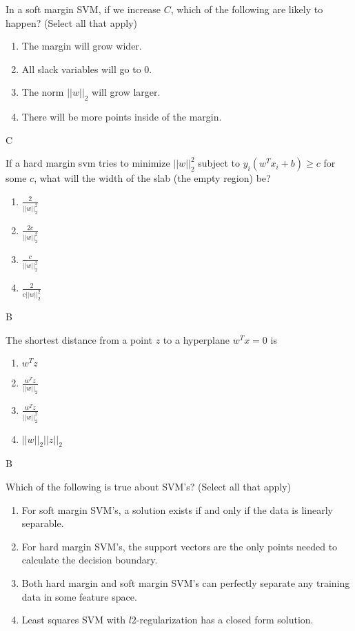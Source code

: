 
\begin{Parts}
\Part In a soft margin SVM, if we increase $C$, which of the following are likely to happen? (Select all that apply)


\begin{enumerate}
\item The margin will grow wider.
\item All slack variables will go to 0.
\item The norm $||w||_2$ will grow larger.
\item There will be more points inside of the margin.
\end{enumerate}

\begin{solution}
C
\end{solution}

\Part If a hard margin svm tries to minimize $||w||_2^2$ subject to $y_i(w^T x_i + b) \geq c$ for some $c$, what will the width of the slab (the empty region) be? 

\begin{enumerate}
\item $\frac{2}{||w||_2^2}$
\item $\frac{2c}{||w||_2^2}$
\item $\frac{c}{||w||_2^2}$
\item $\frac{2}{c||w||_2^2}$
\end{enumerate}

\begin{solution}
B
\end{solution}

\Part The shortest distance from a point $z$ to a hyperplane $w^T x = 0$ is

\begin{enumerate}
\item $w^T z$
\item $\frac{w^T z}{||w||_2}$
\item $\frac{w^T z}{||w||_2^2}$
\item $||w||_2 ||z||_2$
\end{enumerate}

\begin{solution}
B
\end{solution}

\Part Which of the following is true about SVM's? (Select all that apply)

\begin{enumerate}
\item For soft margin SVM's, a solution exists if and only if the data is linearly separable.
\item For hard margin SVM's, the support vectors are the only points needed to calculate the decision boundary.
\item Both hard margin and soft margin SVM's can perfectly separate any training data in some feature space.
\item Least squares SVM with $l2$-regularization has a closed form solution.
\end{enumerate}


\end{Parts}
